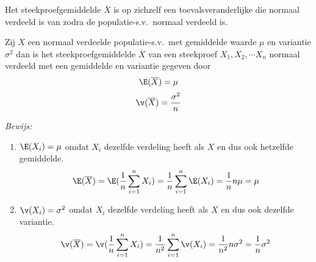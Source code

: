 Het steekproefgemiddelde $\overline{X}$ is op zichzelf een toevalsveranderlijke die normaal verdeeld is van zodra de populatie-s.v.\ normaal verdeeld is.
\begin{stel}\label{gemst}
Zij $X$ een normaal verdeelde populatie-s.v.\ met gemiddelde waarde $\mu$ en variantie $\sigma^2$ dan is het steekproefgemiddelde $\overline{X}$ van een steekproef $X_1, X_2, \cdots X_n$ normaal verdeeld met een gemiddelde en variantie gegeven door
$$\E(\overline{X})=\mu$$
$$\v(\overline{X})=\frac{\sigma^2}{n}$$
\end{stel}
{\em Bewijs:} 
\begin{enumerate}
\item $\E(X_i)=\mu$ omdat $X_i$ dezelfde verdeling heeft als $X$ en dus ook hetzelfde gemiddelde.
$$
\E(\overline{X})=\E(\frac{1}{n}\sum_{i=1}^nX_i)= \frac{1}{n}\sum_{i=1}^n\E(X_i)=\frac{1}{n}n\mu=\mu$$

\item $\v(X_i)=\sigma^2$ omdat $X_i$ dezelfde verdeling heeft als $X$ en dus ook dezelfde variantie.
$$\v(\overline{X})=\v(\frac{1}{n}\sum_{i=1}^nX_i)=\frac{1}{n^2}\sum_{i=1}^n\v(X_i)=\frac{1}{n^2}n\sigma^2=\frac{1}{n}\sigma^2$$

\end{enumerate}
